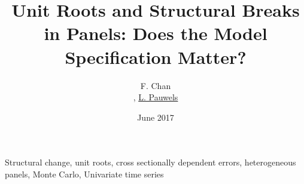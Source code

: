 \documentclass[a4paper,fleqn]{article} %
\begin{document}

\title{Unit Roots and Structural Breaks in Panels: Does the Model Specification Matter?}

\author{F. Chan \address[A1]{\it{School of Economics and Finance, Curtin University, GPO BOX U1987, Perth, Western Australia, 6845}}, \underline{L. Pauwels} \address[A2]{\it Discipline of Econometrics and Business Statistics, University of Sydney, Australia}} %


\date{June 2017}

\begin{keyword}
Structural change, unit roots, cross sectionally dependent errors, heterogeneous panels, Monte Carlo, Univariate time series
\end{keyword}
\end{document}
